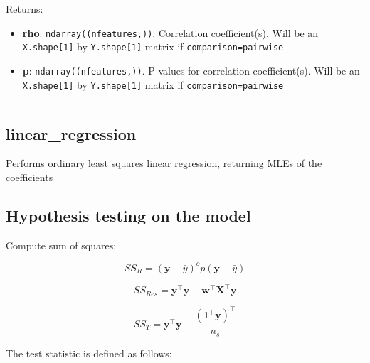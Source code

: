 Returns:

\begin{itemize}
\tightlist
\item
  \textbf{rho}: \texttt{ndarray((nfeatures,))}. Correlation
  coefficient(s). Will be an \texttt{X.shape{[}1{]}} by
  \texttt{Y.shape{[}1{]}} matrix if
  \texttt{comparison=\textquotesingle{}pairwise\textquotesingle{}}
\item
  \textbf{p}: \texttt{ndarray((nfeatures,))}. P-values for correlation
  coefficient(s). Will be an \texttt{X.shape{[}1{]}} by
  \texttt{Y.shape{[}1{]}} matrix if
  \texttt{comparison=\textquotesingle{}pairwise\textquotesingle{}}
\end{itemize}

\begin{center}\rule{0.5\linewidth}{\linethickness}\end{center}

\subsection{linear\_regression}\label{linear_regression}

\begin{Shaded}
\begin{Highlighting}[]
\OperatorTok{=}\OperatorTok{=}\OperatorTok{=}\NormalTok{)}
\end{Highlighting}
\end{Shaded}

Performs ordinary least squares linear regression, returning MLEs of the
coefficients

\subsection{Hypothesis testing on the
model}\label{hypothesis-testing-on-the-model}

Compute sum of squares:

\[
SS_R  = (\mathbf y - \bar{y})^      op (\mathbf y - \bar{y})
\]

\[
SS_{Res} = \mathbf y^\top \mathbf y - \mathbf w^\top \mathbf X^\top \mathbf y
\]

\[
SS_T = \mathbf y^\top \mathbf y - \frac{(\mathbf 1^\top \mathbf y)^\top}{n_s}
\]

The test statistic is defined as follows:

